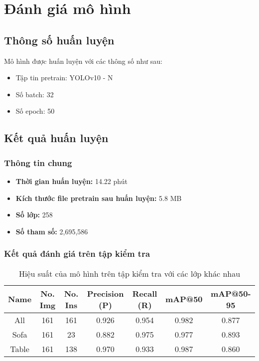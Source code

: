 \section{Đánh giá mô hình}
\subsection{Thông số huấn luyện}
Mô hình được huấn luyện với các thông số như sau:
\begin{itemize}
    \item Tập tin pretrain: YOLOv10 - N
    \item Số batch: 32
    \item Số epoch: 50
\end{itemize}

\subsection{Kết quả huấn luyện}
\subsubsection{Thông tin chung}
\begin{itemize}
    \item \textbf{Thời gian huấn luyện:} 14.22 phút
    \item \textbf{Kích thước file pretrain sau huấn luyện:} 5.8 MB
    \item \textbf{Số lớp:} 258
    \item \textbf{Số tham số:} 2,695,586
\end{itemize}
\subsubsection{Kết quả đánh giá trên tập kiểm tra}

\begin{table}[H]
\centering
\begin{tabular}{|c|c|c|c|c|c|c|}
\hline
\textbf{Name}&\textbf{No. Img} & \textbf{No. Ins} & \textbf{Precision (P)} & \textbf{Recall (R)} & \textbf{mAP@50} & \textbf{mAP@50-95} \\ \hline
All &161 & 161 & 0.926 & 0.954 & 0.982 & 0.877 \\ \hline
Sofa & 161 & 23  & 0.882 & 0.975 & 0.977 & 0.893 \\ \hline
Table & 161 & 138 & 0.970 & 0.933 & 0.987 & 0.860 \\ \hline
\end{tabular}
\caption{Hiệu suất của mô hình trên tập kiểm tra với các lớp khác nhau}
\label{tab:performance_with_H_tag}
\end{table}

